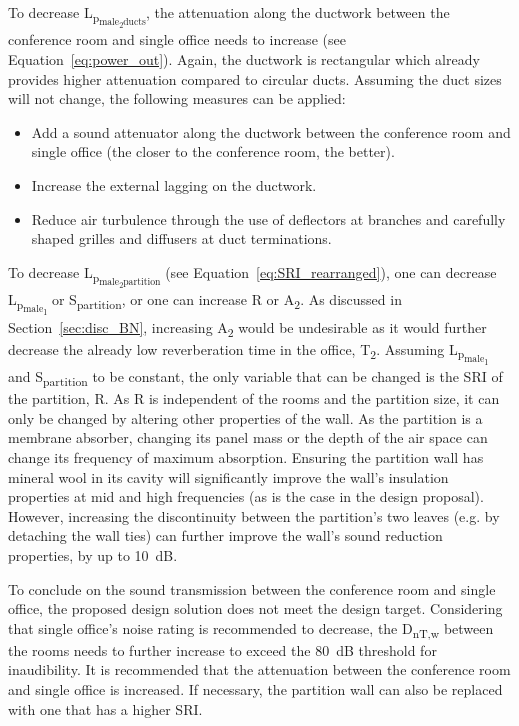 To decrease L\textsubscript{p\textsubscript{male\textsubscript{2}ducts}}, the attenuation along the ductwork between the conference room and single office needs to increase (see Equation~\ref{eq:power_out}).
Again, the ductwork is rectangular which already provides higher attenuation compared to circular ducts.
Assuming the duct sizes will not change, the following measures can be applied:
\begin{itemize}
	\item Add a sound attenuator along the ductwork between the conference room and single office (the closer to the conference room, the better).
	\item Increase the external lagging on the ductwork.
	\item Reduce air turbulence through the use of deflectors at branches and carefully shaped grilles and diffusers at duct terminations. 
\end{itemize}

To decrease L\textsubscript{p\textsubscript{male\textsubscript{2}partition}} (see Equation~\ref{eq:SRI_rearranged}), one can decrease L\textsubscript{p\textsubscript{male\textsubscript{1}}} or S\textsubscript{partition}, or one can increase R or A\textsubscript{2}.
As discussed in Section~\ref{sec:disc_BN}, increasing A\textsubscript{2} would be undesirable as it would further decrease the already low reverberation time in the office, T\textsubscript{2}.
Assuming L\textsubscript{p\textsubscript{male\textsubscript{1}}} and S\textsubscript{partition} to be constant, the only variable that can be changed is the SRI of the partition, R.
As R is independent of the rooms and the partition size, it can only be changed by altering other properties of the wall.
As the partition is a membrane absorber, changing its panel mass or the depth of the air space can change its frequency of maximum absorption.
Ensuring the partition wall has mineral wool in its cavity will significantly improve the wall's insulation properties at mid and high frequencies (as is the case in the design proposal).
However, increasing the discontinuity between the partition's two leaves (e.g. by detaching the wall ties) can further improve the wall's sound reduction properties, by up to 10~dB.

To conclude on the sound transmission between the conference room and single office, the proposed design solution does not meet the design target.
Considering that single office's noise rating is recommended to decrease, the D\textsubscript{nT,w} between the rooms needs to further increase to exceed the 80~dB threshold for inaudibility.
It is recommended that the attenuation between the conference room and single office is increased.
If necessary, the partition wall can also be replaced with one that has a higher SRI.

